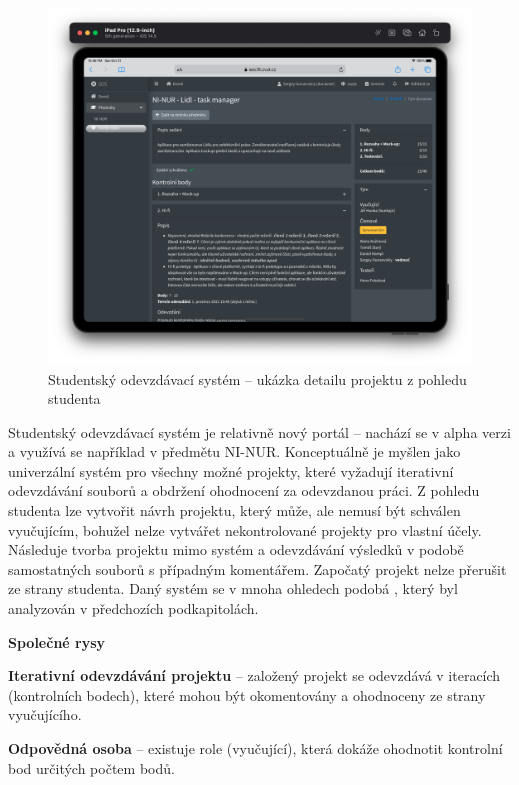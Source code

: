 \begin{figure}[htbp]
   \centering
   \includegraphics[max width=\textwidth]{assets/analysis-sos-portal}
   \caption[Studentský odevzdávací systém – ukázka detailu projektu]{Studentský odevzdávací systém – ukázka detailu projektu z pohledu studenta}\label{pic:sos-portal}
\end{figure}


Studentský odevzdávací systém je relativně nový portál – nachází se v alpha verzi a využívá se například v předmětu NI-NUR.
Konceptuálně je myšlen jako univerzální systém pro všechny možné projekty, které vyžadují iterativní odevzdávání souborů a obdržení ohodnocení za odevzdanou práci.
Z pohledu studenta lze vytvořit návrh projektu, který může, ale nemusí být schválen vyučujícím, bohužel nelze vytvářet nekontrolované projekty pro vlastní účely.
Následuje tvorba projektu mimo systém a odevzdávání výsledků v podobě samostatných souborů s případným komentářem.
Započatý projekt nelze přerušit ze strany studenta.
Daný systém se v mnoha ohledech podobá , který byl analyzován v předchozích podkapitolách.

\textbf{Společné rysy}

\begin{ul}
   \item
   \textbf{Iterativní odevzdávání projektu} – založený projekt se odevzdává v iteracích (kontrolních bodech), které mohou být okomentovány a ohodnoceny ze strany vyučujícího.
   \item
   \textbf{Odpovědná osoba} – existuje role (vyučující), která dokáže ohodnotit kontrolní bod určitých počtem bodů.
\end{ul}


